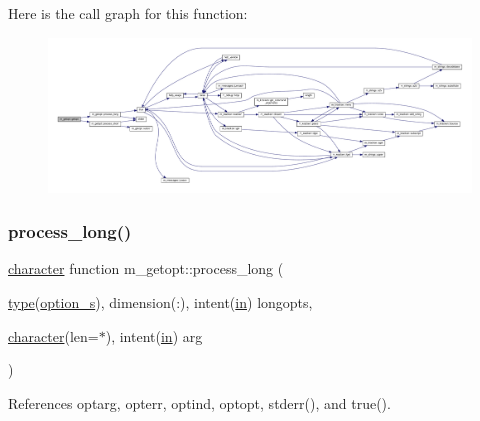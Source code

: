 Here is the call graph for this function\+:
\nopagebreak
\begin{figure}[H]
\begin{center}
\leavevmode
\includegraphics[width=350pt]{namespacem__getopt_a00e4c1d7d61539e0bdf63a6ee13284d2_cgraph}
\end{center}
\end{figure}
\mbox{\label{namespacem__getopt_a47714553b3cda11df4d21bc343760d9c}} 
\subsubsection{\texorpdfstring{process\+\_\+long()}{process\_long()}}
{\footnotesize\ttfamily \hyperlink{option__stopwatch_83_8txt_abd4b21fbbd175834027b5224bfe97e66}{character} function m\+\_\+getopt\+::process\+\_\+long (\begin{DoxyParamCaption}\item[{\hyperlink{stop__watch_83_8txt_a70f0ead91c32e25323c03265aa302c1c}{type}(\hyperlink{structm__getopt_1_1option__s}{option\+\_\+s}), dimension(\+:), intent(\hyperlink{M__journal_83_8txt_afce72651d1eed785a2132bee863b2f38}{in})}]{longopts,  }\item[{\hyperlink{option__stopwatch_83_8txt_abd4b21fbbd175834027b5224bfe97e66}{character}(len=$\ast$), intent(\hyperlink{M__journal_83_8txt_afce72651d1eed785a2132bee863b2f38}{in})}]{arg }\end{DoxyParamCaption})}



References optarg, opterr, optind, optopt, stderr(), and true().

